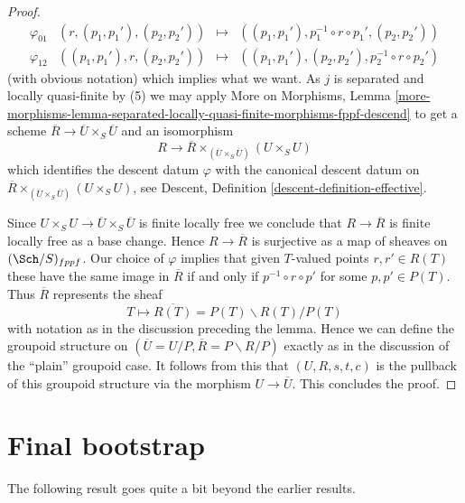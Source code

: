 \begin{proof}
$$\begin{matrix}
\varphi_{01} & (r, (p_1, p_1'), (p_2, p_2')) & \mapsto &
((p_1, p_1'), p_1^{-1} \circ r \circ p_1', (p_2, p_2')) \\
\varphi_{12} & ((p_1, p_1'), r, (p_2, p_2')) & \mapsto &
((p_1, p_1'), (p_2, p_2'), p_2^{-1} \circ r \circ p_2')
\end{matrix}
$$
(with obvious notation) which implies what we want.
As $j$ is separated and locally quasi-finite by (5) we may apply
More on Morphisms, Lemma
\ref{more-morphisms-lemma-separated-locally-quasi-finite-morphisms-fppf-descend}
to get a scheme $\overline{R} \to \overline{U} \times_S \overline{U}$
and an isomorphism
$$
R \to \overline{R} \times_{(\overline{U} \times_S \overline{U})} (U \times_S U)
$$
which identifies the descent datum $\varphi$ with the canonical
descent datum on
$\overline{R} \times_{(\overline{U} \times_S \overline{U})} (U \times_S U)$,
see
Descent, Definition \ref{descent-definition-effective}.

\medskip\noindent
Since $U \times_S U \to \overline{U} \times_S \overline{U}$ is finite
locally free we conclude that $R \to \overline{R}$ is finite locally free
as a base change. Hence $R \to \overline{R}$ is surjective as a map of
sheaves on $(\Sch/S)_{fppf}$.
Our choice of $\varphi$ implies that given $T$-valued points $r, r' \in R(T)$
these have the same image in $\overline{R}$ if and only if
$p^{-1} \circ r \circ p'$ for some $p, p' \in P(T)$. Thus
$\overline{R}$ represents the sheaf
$$
T \longmapsto  \overline{R(T)} = P(T)\backslash R(T)/P(T)
$$
with notation as in the discussion preceding the lemma.
Hence we can define the groupoid structure on
$(\overline{U} = U/P, \overline{R} = P\backslash R/P)$ exactly as in
the discussion of the ``plain'' groupoid case.
It follows from this that $(U, R, s, t, c)$ is the pullback of
this groupoid structure via the morphism $U \to \overline{U}$.
This concludes the proof.
\end{proof}















\section{Final bootstrap}
\label{section-final-bootstrap}

\noindent
The following result goes quite a bit beyond the earlier results.

